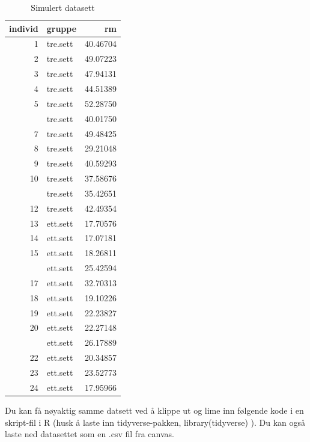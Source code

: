 \documentclass[
]{book}
\begin{document}
\begin{table}

\caption{\label{tab:unnamed-chunk-3}Simulert datasett}
\centering
\begin{tabular}[t]{rlr}
\toprule
individ & gruppe & rm\\
\midrule
1 & tre.sett & 40.46704\\
2 & tre.sett & 49.07223\\
3 & tre.sett & 47.94131\\
4 & tre.sett & 44.51389\\
5 & tre.sett & 52.28750\\
\addlinespace
6 & tre.sett & 40.01750\\
7 & tre.sett & 49.48425\\
8 & tre.sett & 29.21048\\
9 & tre.sett & 40.59293\\
10 & tre.sett & 37.58676\\
\addlinespace
11 & tre.sett & 35.42651\\
12 & tre.sett & 42.49354\\
13 & ett.sett & 17.70576\\
14 & ett.sett & 17.07181\\
15 & ett.sett & 18.26811\\
\addlinespace
16 & ett.sett & 25.42594\\
17 & ett.sett & 32.70313\\
18 & ett.sett & 19.10226\\
19 & ett.sett & 22.23827\\
20 & ett.sett & 22.27148\\
\addlinespace
21 & ett.sett & 26.17889\\
22 & ett.sett & 20.34857\\
23 & ett.sett & 23.52773\\
24 & ett.sett & 17.95966\\
\bottomrule
\end{tabular}
\end{table}

Du kan få nøyaktig samme datsett ved å klippe ut og lime inn følgende kode i en skript-fil i R (husk å laste inn tidyverse-pakken, library(tidyverse) ). Du kan også laste ned datasettet som en .csv fil fra canvas.
\end{document}
